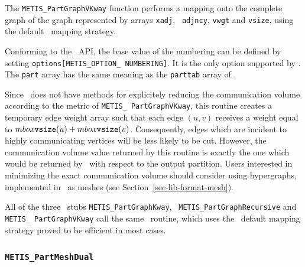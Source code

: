 \begin{itemize}
\progdes

The {\tt METIS\_PartGraphVKway} function performs a mapping onto the
complete graph of the graph represented by arrays {\tt xadj}, {\tt
adjncy}, {\tt vwgt} and {\tt vsize}, using the default
\scotch\ mapping strategy.

Conforming to the \metis\ API, the base value of the numbering
can be defined by setting \texttt{options[METIS\_\lbt OPTION\_\lbt
NUMBERING]}. It is the only option supported by \scotch.
The {\tt part} array has the same meaning as the {\tt parttab} array
of \scotch.

Since \scotch\ does not have methods for explicitely reducing the
communication volume according to the metric of {\tt METIS\_\lbo
Part\lbo Graph\lbo VKway}, this routine creates a temporary
edge weight array such that each edge $(u,v)$ receives a weight
equal to $mbox{\tt vsize}(u) + mbox{\tt vsize}(v)$. Consequently,
edges which are incident to highly communicating vertices will be
less likely to be cut. However, the communication volume value
returned by this routine is exactly the one which would be returned
by \metis\ with respect to the output partition. Users interested
in minimizing the exact communication volume should consider using
hypergraphs, implemented in \scotch\ as
meshes (see Section~\ref{sec-lib-format-mesh}).

All of the three \metis\ stubs
{\tt METIS\_\lbo Part\lbo Graph\lbo Kway}, {\tt
METIS\_\lbo Part\lbo Graph\lbo Recursive} and {\tt METIS\_\lbo
Part\lbo Graph\lbo VKway} call the same \scotch\ routine, which uses
the \scotch\ default mapping strategy proved to be efficient in most
cases.
\end{itemize}

\subsubsection{{\tt METIS\_PartMeshDual}}

